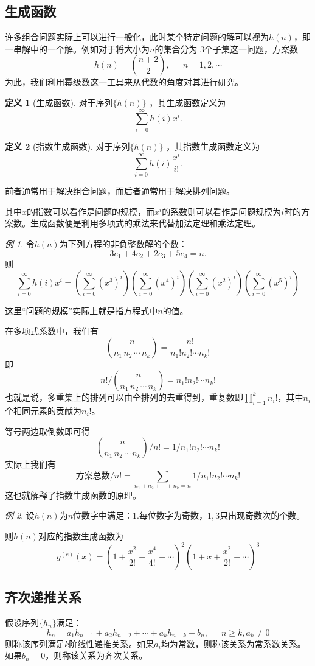 \documentclass[a4paper,11pt]{article}%
\theoremstyle{remark}
\theoremstyle{remark}
\newtheorem*{example}{例}
\theoremstyle{definition}
\theoremstyle{definition}
\newtheorem*{definition}{定义}
\theoremstyle{definition}
\begin{document}
\subsection{生成函数}
许多组合问题实际上可以进行一般化，此时某个特定问题的解可以视为$h(n)$，即一串解中的一个解。例如对于将大小为$n$的集合分为 3个子集这一问题，方案数 
\[ h(n)=\binom{n+2}{2},\phantom{111}n=1,2,\cdots\] 
为此，我们利用幂级数这一工具来从代数的角度对其进行研究。
\begin{definition}[生成函数]
   对于序列$\{h(n)\}$ ，其生成函数定义为
   \[\sum_{i=0}^{\infty}h(i)x^i.\]
\end{definition}
\begin{definition}[指数生成函数]
   对于序列$\{h(n)\}$ ，其指数生成函数定义为
   \[\sum_{i=0}^{\infty}h(i)\frac{x^i}{i!}.\]
\end{definition}
前者通常用于解决组合问题，而后者通常用于解决排列问题。

其中$x$的指数可以看作是问题的规模，而$x^i$的系数则可以看作是问题规模为$i$时的方案数。生成函数便是利用多项式的乘法来代替加法定理和乘法定理。
\begin{example}
    令$h(n)$为下列方程的非负整数解的个数：
    \[3e_1+4e_2+2e_3+5e_4=n.\]
    则 
    \[\sum_{i=0}^\infty h(i)x^i = \left(\sum_{i=0}^{\infty}(x^3)^i\right)\left(\sum_{i=0}^{\infty}(x^4)^i\right)\left(\sum_{i=0}^{\infty}(x^2)^i\right)\left(\sum_{i=0}^{\infty}(x^5)^i\right)\]
\end{example}
这里“问题的规模”实际上就是指方程式中$n$的值。

在多项式系数中，我们有
\[\binom{n}{n_1\,n_2\,\cdots\,n_k}=\frac{n!}{n_1!n_2!\cdots n_k!}\]
即 
\[
    n!/\binom{n}{n_1\,n_2\,\cdots\,n_k}
    =n_1!n_2!\cdots n_k!
\]
也就是说，多重集上的排列可以由全排列的去重得到，重复数即$\prod_{i=1}^kn_i!$，其中$n_i$个相同元素的贡献为$n_i!$。


等号两边取倒数即可得
\[
    \binom{n}{n_1\,n_2\,\cdots\,n_k}/n!
    =1/n_1!n_2!\cdots n_k!
\]
实际上我们有 
\[ \text{方案总数}/n!=\sum_{n_1+n_2+\cdots+n_k=n}1/n_1!n_2!\cdots n_k!\]
这也就解释了指数生成函数的原理。
\begin{example}
    设$h(n)$为$n$位数字中满足：1.每位数字为奇数，$1,3$只出现奇数次的个数。

    则$h(n)$对应的指数生成函数为 
    \[g^{(e)}(x)=\left(1+\frac{x^2}{2!}+\frac{x^4}{4!}+\cdots\right)^2\left(1+x+ \frac{x^2}{2!}+\cdots\right)^3\]
\end{example}
\subsection{齐次递推关系}
假设序列$\{h_n\}$满足：
\[h_n=a_1h_{n-1}+a_2h_{n-2}+\cdots+a_kh_{n-k}+b_n,\phantom{111}n\geq k, a_k\neq 0\]
则称该序列满足$k$阶线性递推关系。如果$a_i$均为常数，则称该关系为常系数关系。如果$b_n=0$，则称该关系为齐次关系。
\end{document}
